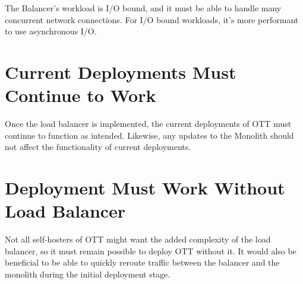 The Balancer's workload is I/O bound, and it must be able to handle many concurrent network connections. For I/O bound workloads, it's more performant to use asynchronous I/O\cite{async-vs-threads}.

\section{Current Deployments Must Continue to Work}

Once the load balancer is implemented, the current deployments of OTT must continue to function as intended. Likewise, any updates to the Monolith should not affect the functionality of current deployments.

\section{Deployment Must Work Without Load Balancer}

Not all self-hosters of OTT might want the added complexity of the load balancer, so it must remain possible to deploy OTT without it. It would also be beneficial to be able to quickly reroute traffic between the balancer and the monolith during the initial deployment stage.